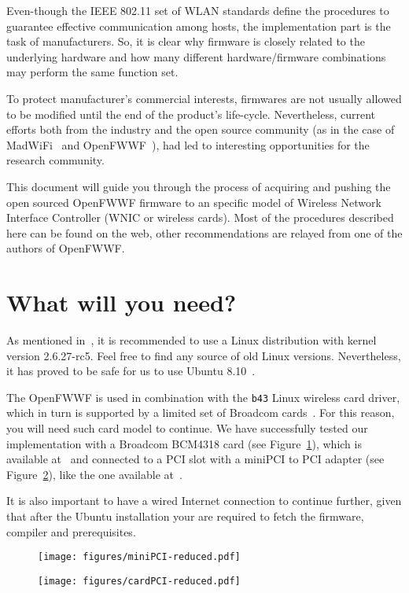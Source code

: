 \documentclass[conference]{IEEEtran}
\begin{document}
Even-though the IEEE 802.11 set of WLAN standards define the procedures to guarantee effective communication among hosts, the implementation part is the task of manufacturers. So, it is clear why firmware is closely related to the underlying hardware and how many different hardware/firmware combinations may perform the same function set.

To protect manufacturer's commercial interests, firmwares are not usually allowed to be modified until the end of the product's life-cycle. Nevertheless, current efforts both from the industry and the open source community (as in the case of MadWiFi~\cite{madWiFi} and OpenFWWF~\cite{OpenFWWF}), had led to interesting opportunities for the research community.

This document will guide you through the process of acquiring and pushing the open sourced OpenFWWF firmware to an specific model of Wireless Network Interface Controller (WNIC or wireless cards). Most of the procedures described here can be found on the web, other recommendations are relayed from one of the authors of OpenFWWF.

\section{What will you need?}\label{hardware}
As mentioned in~\cite{OpenFWWF}, it is recommended to use a Linux distribution with kernel version 2.6.27-rc5. Feel free to find any source of old Linux versions. Nevertheless, it has proved to be safe for us to use Ubuntu 8.10~\cite{ubuntu8}.

The OpenFWWF is used in combination with the \texttt{b43} Linux  wireless card driver, which in turn is supported by a limited set of Broadcom cards~\cite{b43-info}. For this reason, you will need such card model to continue. We have successfully tested our implementation with a Broadcom BCM4318 card (see Figure~\ref{fig:miniPCI}), which is available at~\cite{bcm4318} and connected to a PCI slot with a miniPCI to PCI adapter (see Figure~\ref{fig:PCI}), like the one available at~\cite{PCIAdapter}.

It is also important to have a wired Internet connection to continue further, given that after the Ubuntu installation your are required to fetch the firmware, compiler and prerequisites.

\begin{figure*}[t]
\centering
\begin{subfigure}{.5\textwidth}
  \centering
  \texttt{[image: figures/miniPCI-reduced.pdf]}
  \caption{}
  \label{fig:miniPCI}
\end{subfigure}%
\begin{subfigure}{.5\textwidth}
  \centering
  \texttt{[image: figures/cardPCI-reduced.pdf]}
  \caption{}
  \label{fig:PCI}
\end{subfigure}
\caption{\ref{fig:miniPCI}) Broadcom BCM418 miniPCI. \ref{fig:PCI}) Card correctly placed into the PCI adapter.}
\label{installedCard}
\end{figure*}
\end{document}
